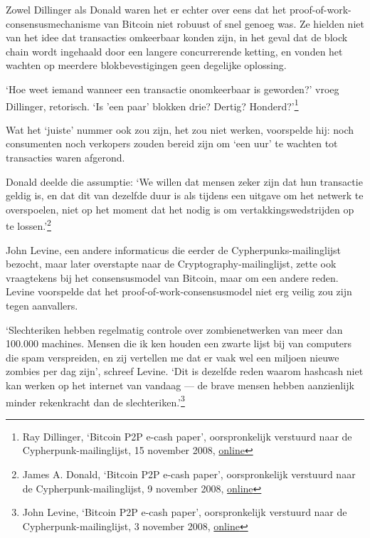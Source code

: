 \documentclass[
  a5paper,
  smalldemyvopaper,11pt,twoside,onecolumn,openright,extrafontsizes]{memoir}
\begin{document}
Zowel Dillinger als Donald waren het er echter over eens dat het
proof-of-work-consensusmechanisme van Bitcoin niet robuust of snel
genoeg was. Ze hielden niet van het idee dat transacties omkeerbaar
konden zijn, in het geval dat de block chain wordt ingehaald door een
langere concurrerende ketting, en vonden het wachten op meerdere
blokbevestigingen geen degelijke oplossing.

`Hoe weet iemand wanneer een transactie onomkeerbaar is geworden?' vroeg
Dillinger, retorisch. `Is 'een paar' blokken drie? Dertig?
Honderd?'\footnote{Ray Dillinger, `Bitcoin P2P e-cash paper',
  oorspronkelijk verstuurd naar de Cypherpunk-mailinglijst, 15 november
  2008,
  \href{https://www.metzdowd.com/pipermail/cryptography/2008-November/014859.html}{online}}

Wat het `juiste' nummer ook zou zijn, het zou niet werken, voorspelde
hij: noch consumenten noch verkopers zouden bereid zijn om `een uur' te
wachten tot transacties waren afgerond.

Donald deelde die assumptie: `We willen dat mensen zeker zijn dat hun
transactie geldig is, en dat dit van dezelfde duur is als tijdens een
uitgave om het netwerk te overspoelen, niet op het moment dat het nodig
is om vertakkingswedstrijden op te lossen.'\footnote{James A. Donald,
  `Bitcoin P2P e-cash paper', oorspronkelijk verstuurd naar de
  Cypherpunk-mailinglijst, 9 november 2008,
  \href{https://www.metzdowd.com/pipermail/cryptography/2008-November/014841.html}{online}}

John Levine, een andere informaticus die eerder de
Cypherpunks-mailinglijst bezocht, maar later overstapte naar de
Cryptography-mailinglijst, zette ook vraagtekens bij het consensusmodel
van Bitcoin, maar om een andere reden. Levine voorspelde dat het
proof-of-work-consensusmodel niet erg veilig zou zijn tegen aanvallers.

`Slechteriken hebben regelmatig controle over zombienetwerken van meer
dan 100.000 machines. Mensen die ik ken houden een zwarte lijst bij van
computers die spam verspreiden, en zij vertellen me dat er vaak wel een
miljoen nieuwe zombies per dag zijn', schreef Levine. `Dit is dezelfde
reden waarom hashcash niet kan werken op het internet van vandaag --- de
brave mensen hebben aanzienlijk minder rekenkracht dan de
slechteriken.'\footnote{John Levine, `Bitcoin P2P e-cash paper',
  oorspronkelijk verstuurd naar de Cypherpunk-mailinglijst, 3 november
  2008,
  \href{https://www.metzdowd.com/pipermail/cryptography/2008-November/014817.html}{online}}
\end{document}
